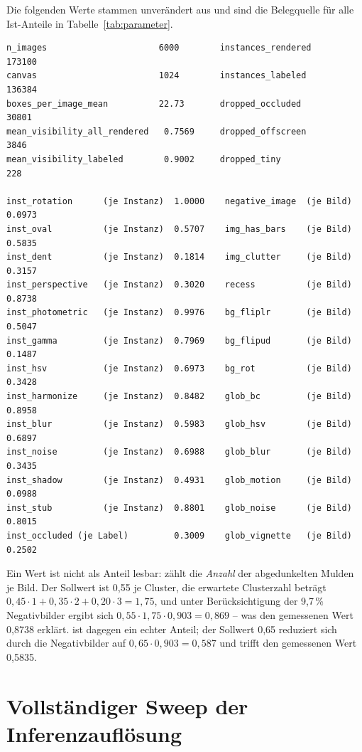 Die folgenden Werte stammen unverändert aus
 und sind die Belegquelle für alle
Ist-Anteile in Tabelle~\ref{tab:parameter}.

\begin{footnotesize}
\begin{verbatim}
n_images                      6000        instances_rendered      173100
canvas                        1024        instances_labeled       136384
boxes_per_image_mean          22.73       dropped_occluded         30801
mean_visibility_all_rendered   0.7569     dropped_offscreen         3846
mean_visibility_labeled        0.9002     dropped_tiny               228

inst_rotation      (je Instanz)  1.0000    negative_image  (je Bild)  0.0973
inst_oval          (je Instanz)  0.5707    img_has_bars    (je Bild)  0.5835
inst_dent          (je Instanz)  0.1814    img_clutter     (je Bild)  0.3157
inst_perspective   (je Instanz)  0.3020    recess          (je Bild)  0.8738
inst_photometric   (je Instanz)  0.9976    bg_fliplr       (je Bild)  0.5047
inst_gamma         (je Instanz)  0.7969    bg_flipud       (je Bild)  0.1487
inst_hsv           (je Instanz)  0.6973    bg_rot          (je Bild)  0.3428
inst_harmonize     (je Instanz)  0.8482    glob_bc         (je Bild)  0.8958
inst_blur          (je Instanz)  0.5983    glob_hsv        (je Bild)  0.6897
inst_noise         (je Instanz)  0.6988    glob_blur       (je Bild)  0.3435
inst_shadow        (je Instanz)  0.4931    glob_motion     (je Bild)  0.0988
inst_stub          (je Instanz)  0.8801    glob_noise      (je Bild)  0.8015
inst_occluded (je Label)         0.3009    glob_vignette   (je Bild)  0.2502
\end{verbatim}
\end{footnotesize}

Ein Wert ist nicht als Anteil lesbar:  zählt die \emph{Anzahl} der
abgedunkelten Mulden je Bild. Der Sollwert ist 0,55 je Cluster, die erwartete
Clusterzahl beträgt
$0{,}45 \cdot 1 + 0{,}35 \cdot 2 + 0{,}20 \cdot 3 = 1{,}75$, und unter
Berücksichtigung der 9,7\,\% Negativbilder ergibt sich
$0{,}55 \cdot 1{,}75 \cdot 0{,}903 = 0{,}869$ -- was den gemessenen Wert 0,8738
erklärt.  ist dagegen ein echter Anteil; der Sollwert 0,65
reduziert sich durch die Negativbilder auf $0{,}65 \cdot 0{,}903 = 0{,}587$ und
trifft den gemessenen Wert 0,5835.

\section{Vollständiger Sweep der Inferenzauflösung}

